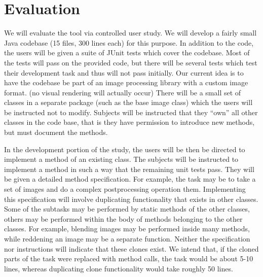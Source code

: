 \documentclass[nocopyrightspace,10pt]{sigplanconf}
\begin{document}
\section{Evaluation}
\label{sec:eval}


We will evaluate the tool via controlled user study. We will develop a
fairly small Java codebase (15 files, 300 lines each) for this
purpose. In addition to the code, the users will be given a suite of
JUnit tests which cover the codebase.  Most of the tests will pass on
the provided code, but there will be several tests which test their
development task and thus will not pass initially.  Our current idea
is to have the codebase be part of an image processing library with a
custom image format. (no visual rendering will actually occur) There
will be a small set of classes in a separate package (such as the base
image class) which the users will be instructed not to
modify. Subjects will be instructed that they ``own'' all other
classes in the code base, that is they have permission to introduce
new methods, but must document the methods.

In the development portion of the study, the users will be then be directed
to implement a method of an existing class. The subjects will be instructed to implement a method 
in such a way that the remaining unit tests pass.  They will be given a detailed 
 method specification. For example, the task may be to take a set of images and do a complex postprocessing operation them.  Implementing this specification will involve
 duplicating functionality that exists in other classes.  Some of the subtasks may be 
performed by static methods of the other classes, others may be performed 
within the body of methods belonging to the other classes. For example, blending images may be performed inside many methods, while reddening an image may be a separate function.
 Neither the specification
nor instructions will indicate that these clones exist.  We intend that, if the cloned parts of the 
task were replaced with method calls, the task would be about 5-10 lines, whereas duplicating clone functionality would take roughly 50 lines.
\end{document}
